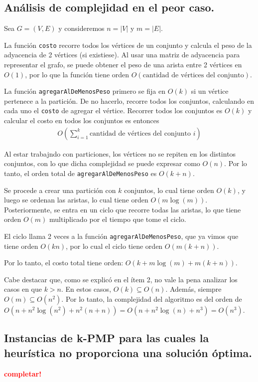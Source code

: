 \newpage
\subsection{Análisis de complejidad en el peor caso.}
\vspace*{0.3cm}

Sea $G = (V,E)$ y consideremos $n = |V|$ y $m = |E|$.

La función \texttt{costo} recorre todos los vértices de un conjunto y calcula
el peso de la adyacencia de 2 vértices (si existiese). Al usar una matriz de
adyacencia para representar el grafo, se puede obtener el peso de una arista
entre 2 vértices en $O(1)$, por lo que la función tiene orden $O(\text{cantidad
de vértices del conjunto})$.

La función \texttt{agregarAlDeMenosPeso} primero se fija en $O(k)$ si un
vértice pertenece a la partición. De no hacerlo, recorre todos los conjuntos,
calculando en cada uno el \texttt{costo} de agregar el vértice. Recorrer todos
los conjuntos es $O(k)$ y calcular el costo en todos los conjuntos es entonces
\begin{align*}
  O(\sum_{i=1}^k \text{cantidad de vértices del conjunto } i)
\end{align*}

Al estar trabajndo con particiones, los vértices no se repiten en los distintos
conjuntos, con lo que dicha complejidad se puede expresar como $O(n)$. Por lo
tanto, el orden total de \texttt{agregarAlDeMenosPeso} es $O(k + n)$.

Se procede a crear una partición con $k$ conjuntos, lo cual tiene orden $O(k)$,
y luego se ordenan las aristas, lo cual tiene orden $O(m\log(m))$.
Posteriormente, se entra en un ciclo que recorre todas las aristas, lo que tiene
orden $O(m)$ multiplicado por el tiempo que tome el ciclo.

El ciclo llama 2 veces a la función \texttt{agregarAlDeMenosPeso}, que ya vimos
que tiene orden $O(kn)$, por lo cual el ciclo tiene orden $O(m(k + n))$.

Por lo tanto, el costo total tiene orden: $O(k + m\log(m) + m(k + n))$.

Cabe destacar que, como se explicó en el ítem 2, no vale la pena analizar los
casos en que $k > n$. En estos casos, $O(k) \subseteq O(n)$. Además, siempre
$O(m) \subseteq O(n^2)$. Por lo tanto, la complejidad del algoritmo es del
orden de $O(n + n^2 \log(n^2) + n^2 (n + n)) = O(n + n^2 \log(n) + n^3) =
O(n^3)$.

\newpage
\subsection{Instancias de k-PMP para las cuales la heurística no proporciona
            una solución óptima.}
\vspace*{0.3cm}
\textcolor{red}{\textbf{completar!}}

